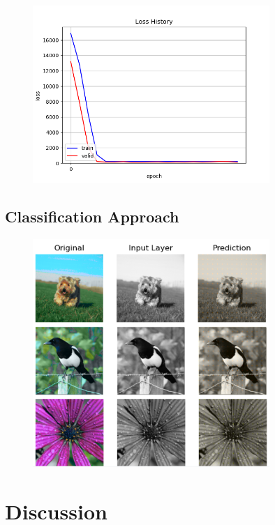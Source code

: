 \documentclass[12pt,letterpaper]{article}
\begin{document}
\begin{figure}[h!]
	\centering
	\includegraphics[width=0.8\textwidth]{loss_classical.png}
	\caption{}
	\label{loss_class}
\end{figure}

\subsection{Classification Approach}
\begin{figure}
	\centering
	\includegraphics[width=0.8\textwidth]{classific_predict.png}
	\caption{}
	\label{class}
\end{figure}

\section{Discussion}
\end{document}
